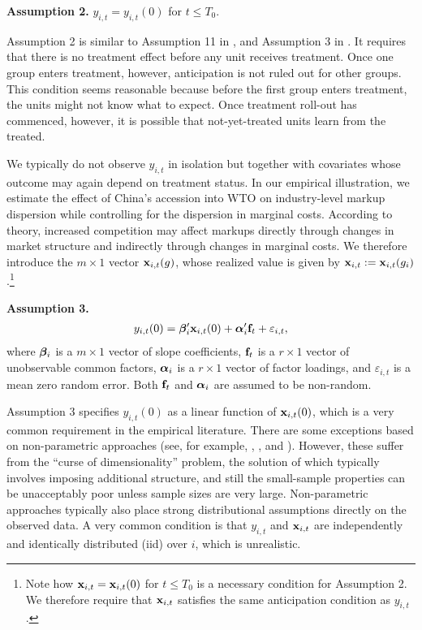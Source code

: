 \documentclass[12pt,fleqn]{article}
\begin{document}
  \bigskip
  
  \noindent \textbf{Assumption 2.} $y_{i,t} = y_{i,t}(0)$ for $t \leq T_0$.
  
  \bigskip
  
  Assumption 2 is similar to Assumption 11 in \citet{Callaway_Karami_2020}, and Assumption 3 in \citet{Callaway_SantAnna_2020}. It requires that there is no treatment effect before any unit receives treatment. Once one group enters treatment, however, anticipation is not ruled out for other groups. This condition seems reasonable because before the first group enters treatment, the units might not know what to expect. Once treatment roll-out has commenced, however, it is possible that not-yet-treated units learn from the treated.
  
  We typically do not observe $y_{i,t}$ in isolation but together with covariates whose outcome may again depend on treatment status. In our empirical illustration, we estimate the effect of China's accession into WTO on industry-level markup dispersion while controlling for the dispersion in marginal costs. According to theory, increased competition may affect markups directly through changes in market structure and indirectly through changes in marginal costs. We therefore introduce the $m\times 1$ vector $\mathbf{x}_{i,t}(g)$, whose realized value is given by $\mathbf{x}_{i,t} := \mathbf{x}_{i,t}(g_i)$.\footnote{Note how $\mathbf{x}_{i,t} = \mathbf{x}_{i,t}(0)$ for $t \leq T_0$ is a necessary condition for Assumption 2. We therefore require that $\mathbf{x}_{i,t}$ satisfies the same anticipation condition as $y_{i,t}$.}
  
  \bigskip
  
  \noindent \textbf{Assumption 3.}
  \begin{align*}
  y_{i,t}(0) = \boldsymbol{\beta}_i'\mathbf{x}_{i,t}(0) + \boldsymbol{\alpha}_i'\mathbf{f}_t + \varepsilon_{i,t},
  \end{align*}
  where $\boldsymbol{\beta}_i$ is a $m\times 1$ vector of slope coefficients, $\mathbf{f}_t$ is a $r \times 1$ vector of unobservable common factors, $\boldsymbol{\alpha}_i$ is a $r\times 1$ vector of factor loadings, and $\varepsilon_{i,t}$ is a mean zero random error. Both $\mathbf{f}_t$ and $\boldsymbol{\alpha}_i$ are assumed to be non-random.
  
  \bigskip
  
  Assumption 3 specifies $y_{i,t}(0)$ as a linear function of $\mathbf{x}_{i,t}(0)$, which is a very common requirement in the empirical literature. There are some exceptions based on non-parametric approaches (see, for example, \citealp{Abadie_2005}, \citealp{Callaway_SantAnna_2020}, and \citealp{SantAnna_Zhao2020}). However, these suffer from the ``curse of dimensionality'' problem, the solution of which typically involves imposing additional structure, and still the small-sample properties can be unacceptably poor unless sample sizes are very large. Non-parametric approaches typically also place strong distributional assumptions directly on the observed data. A very common condition is that $y_{i,t}$ and $\mathbf{x}_{i,t}$ are independently and identically distributed (iid) over $i$, which is unrealistic.
  
\end{document}
